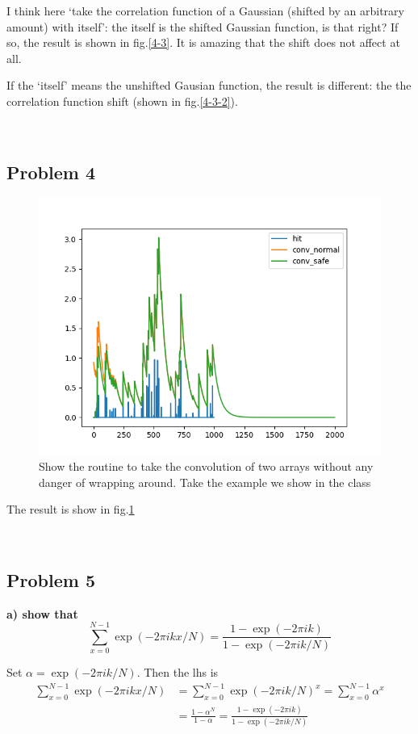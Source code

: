 \documentclass[showpacs, oneside, onecolumn, prl, amsmath, amssymb, nofootinbib, superscriptaddress, notitlepage]{revtex4-1}
\newcommand\be{\begin{equation}}
\newcommand\bas{\begin{align*}}
\newcommand\bfig{\begin{figure}}
\newcommand\ee{\end{equation}}
\newcommand\efig{\end{figure}}
\begin{document}
I think here `take the correlation function of a Gaussian (shifted by an arbitrary amount) with itself': the itself is the shifted Gaussian function, is that right? If so, the result is shown in fig.\ref{4-3}. It is amazing that the shift does not affect at all.

If the `itself' means the unshifted Gausian function, the result is different: the the correlation function shift (shown in fig.\ref{4-3-2}).
 

~~~~

\subsection{Problem 4}

\bfig
	\centering
	\includegraphics[scale=1]{4-4.png}
	\caption{Show the routine to take the convolution of two arrays without any danger of wrapping around. Take the example we show in the class}
	\label{4-4}
\efig

The result is show in fig.\ref{4-4}


~~~~

\subsection{Problem 5}

\textbf{a) show that}
\be
\sum_{x=0}^{N-1}\exp(-2\pi ikx/N)=\frac{1-\exp(-2\pi ik)}{1-\exp(-2\pi ik/N)}
\ee

Set $\alpha=\exp(-2\pi ik/N)$. Then the lhs is
\bas
\sum_{x=0}^{N-1}\exp(-2\pi ikx/N)&=\sum_{x=0}^{N-1}\exp(-2\pi ik/N)^x=\sum_{x=0}^{N-1}\alpha^x\\
&=\frac{1-\alpha^N}{1-\alpha}=\frac{1-\exp(-2\pi ik)}{1-\exp(-2\pi ik/N)}
\end{align*}
\end{document}
